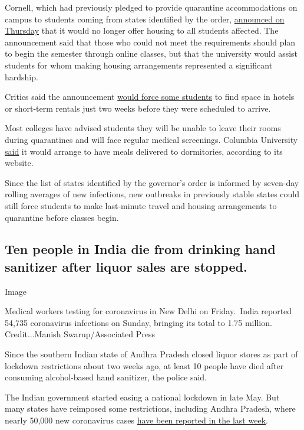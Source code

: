 Cornell, which had previously pledged to provide quarantine
accommodations on campus to students coming from states identified by
the order,
\href{https://covid.cornell.edu/updates/20200730-important-updates.cfm}{announced
on Thursday} that it would no longer offer housing to all students
affected. The announcement said that those who could not meet the
requirements should plan to begin the semester through online classes,
but that the university would assist students for whom making housing
arrangements represented a significant hardship.

Critics said the announcement
\href{https://cornellsun.com/2020/07/31/editorial-cornells-inability-to-quarantine-arriving-students-should-concern-you/}{would
force some students} to find space in hotels or short-term rentals just
two weeks before they were scheduled to arrive.

Most colleges have advised students they will be unable to leave their
rooms during quarantines and will face regular medical screenings.
Columbia University
\href{https://roomselection.housing.columbia.edu/}{said} it would
arrange to have meals delivered to dormitories, according to its
website.

Since the list of states identified by the governor's order is informed
by seven-day rolling averages of new infections, new outbreaks in
previously stable states could still force students to make last-minute
travel and housing arrangements to quarantine before classes begin.

\hypertarget{ten-people-in-india-die-from-drinking-hand-sanitizer-after-liquor-sales-are-stopped}{%
\subsection{Ten people in India die from drinking hand sanitizer after
liquor sales are
stopped.}\label{ten-people-in-india-die-from-drinking-hand-sanitizer-after-liquor-sales-are-stopped}}

Image

Medical workers testing for coronavirus in New Delhi on Friday.~India
reported 54,735 coronavirus infections on Sunday, bringing its total to
1.75 million. Credit...Manish Swarup/Associated Press

Since the southern Indian state of Andhra Pradesh closed liquor stores
as part of lockdown restrictions about two weeks ago, at least 10 people
have died after consuming alcohol-based hand sanitizer, the police said.

The Indian government started easing a national lockdown in late May.
But many states have reimposed some restrictions, including Andhra
Pradesh, where nearly 50,000 new coronavirus cases
\href{https://www.nytimes.com/interactive/2020/world/asia/india-coronavirus-cases.html\#cases}{have
been reported in the last week}.

